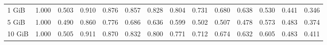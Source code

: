 \begin{centering}
\begin{table}[!h]
\begin{tabular}{lrrrrrrrrrrrrr}
		1 GiB   & 1.000 & 0.503 & 0.910 & 0.876 & 0.857 & 0.828 & 0.804 & 0.731 & 0.680 & 0.638 & 0.530 & 0.441 & 0.346 \\
		5 GiB   & 1.000 & 0.490 & 0.860 & 0.776 & 0.686 & 0.636 & 0.599 & 0.502 & 0.507 & 0.478 & 0.573 & 0.483 & 0.374 \\
		10 GiB  & 1.000 & 0.505 & 0.911 & 0.870 & 0.832 & 0.800 & 0.771 & 0.712 & 0.674 & 0.632 & 0.605 & 0.483 & 0.411 \\
		\bottomrule
	\end{tabular}
\end{table}
\end{centering}